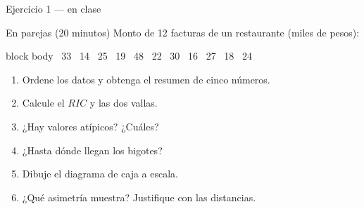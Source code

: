 \documentclass[aspectratio=169,10pt]{beamer}
\begin{document}
\begin{frame}{Ejercicio 1 — en clase}
  \begin{alertblock}{En parejas (20 minutos)}
    \footnotesize
    Monto de 12 facturas de un restaurante (miles de pesos):

    \vspace{0.15cm}
    \begin{beamercolorbox}[wd=0.9\textwidth,sep=0.1cm]{block body}
      \centering\scriptsize{} \ 33 \ 14 \ 25 \ 19 \ 48 \ 22 \ 30 \ 16 \ 27 \ 18 \ 24
    \end{beamercolorbox}

    \vspace{0.2cm}
    \begin{enumerate}\setlength{\itemsep}{-0.05cm}
      \item Ordene los datos y obtenga el resumen de cinco números.
      \item Calcule el $RIC$ y las dos vallas.
      \item ¿Hay valores atípicos? ¿Cuáles?
      \item ¿Hasta dónde llegan los bigotes?
      \item Dibuje el diagrama de caja a escala.
      \item ¿Qué asimetría muestra? Justifique con las distancias.
    \end{enumerate}
  \end{alertblock}
\end{frame}
\end{document}
